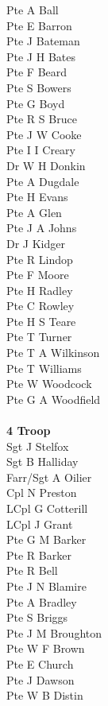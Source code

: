 \begin{multicols}{3}
  Pte A Ball \\
  Pte E Barron \\
  Pte J Bateman \\
  Pte J H Bates \\
  Pte F Beard \\
  Pte S Bowers \\
  Pte G Boyd \\
  Pte R S Bruce \\
  Pte J W Cooke \\
  Pte I I Creary \\
  Dr W H Donkin \\
  Pte A Dugdale \\
  Pte H Evans \\
  Pte A Glen \\
  Pte J A Johns \\
  Dr J Kidger \\
  Pte R Lindop \\
  Pte F Moore \\
  Pte H Radley \\
  Pte C Rowley \\
  Pte H S Teare \\
  Pte T Turner \\
  Pte T A Wilkinson \\
  Pte T Williams \\
  Pte W Woodcock \\
  Pte G A Woodfield \\
  \\
  \textbf{4 Troop} \\
  Sgt J Stelfox \\
  Sgt B Halliday \\
  Farr/Sgt A Oilier \\
  Cpl N Preston \\
  LCpl G Cotterill \\
  LCpl J Grant \\
  Pte G M Barker \\
  Pte R Barker \\
  Pte R Bell \\
  Pte J N Blamire \\
  Pte A Bradley \\
  Pte S Briggs \\
  Pte J M Broughton \\
  Pte W F Brown \\
  Pte E Church \\
  Pte J Dawson \\
  Pte W B Distin \\

\end{multicols}
